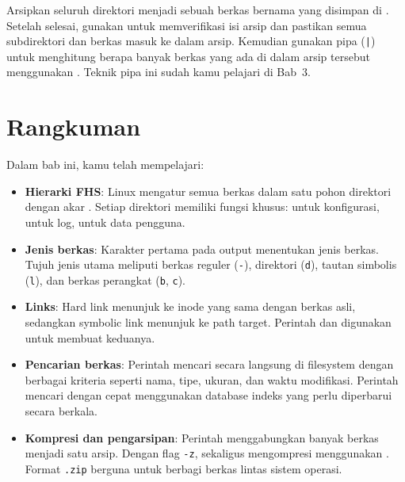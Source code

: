 \begin{challengebox}
Arsipkan seluruh direktori  menjadi sebuah berkas bernama
 yang disimpan di . Setelah selesai, gunakan
 untuk memverifikasi isi arsip dan pastikan semua subdirektori dan berkas
masuk ke dalam arsip. Kemudian gunakan pipa (\texttt{|}) untuk menghitung berapa banyak
berkas yang ada di dalam arsip tersebut menggunakan . Teknik pipa ini sudah
kamu pelajari di Bab~3.
\end{challengebox}

\section{Rangkuman}
\label{sec:summary-filesystem}

Dalam bab ini, kamu telah mempelajari:

\begin{itemize}[noitemsep,topsep=2pt]
    \item \textbf{Hierarki FHS}: Linux mengatur semua berkas dalam satu pohon direktori dengan akar \dir{/}. Setiap direktori memiliki fungsi khusus:  untuk konfigurasi,  untuk log,  untuk data pengguna.
    \item \textbf{Jenis berkas}: Karakter pertama pada output  menentukan jenis berkas. Tujuh jenis utama meliputi berkas reguler (\texttt{-}), direktori (\texttt{d}), tautan simbolis (\texttt{l}), dan berkas perangkat (\texttt{b}, \texttt{c}).
    \item \textbf{Links}: Hard link menunjuk ke inode yang sama dengan berkas asli, sedangkan symbolic link menunjuk ke path target. Perintah  dan  digunakan untuk membuat keduanya.
    \item \textbf{Pencarian berkas}: Perintah  mencari secara langsung di filesystem dengan berbagai kriteria seperti nama, tipe, ukuran, dan waktu modifikasi. Perintah  mencari dengan cepat menggunakan database indeks yang perlu diperbarui secara berkala.
    \item \textbf{Kompresi dan pengarsipan}: Perintah  menggabungkan banyak berkas menjadi satu arsip. Dengan flag \texttt{-z},  sekaligus mengompresi menggunakan . Format \texttt{.zip} berguna untuk berbagi berkas lintas sistem operasi.
\end{itemize}

